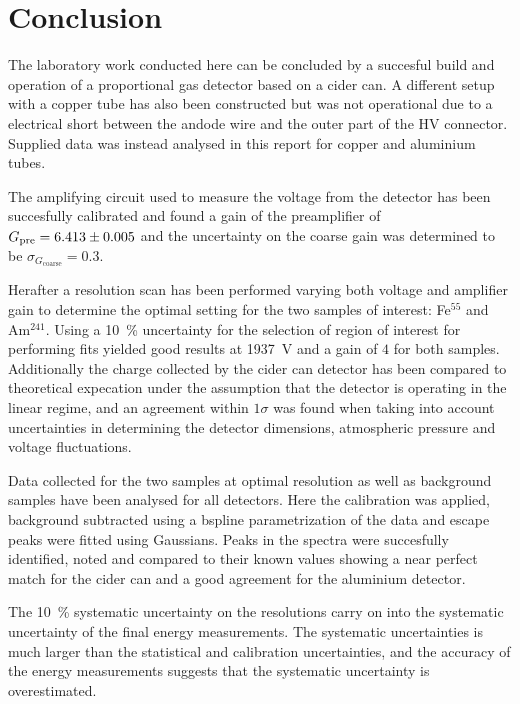 \section{Conclusion}
The laboratory work conducted here can be concluded by a succesful build and
operation of a proportional gas detector based on a cider can. A different setup
with a copper tube has also been constructed but was not operational due to a
electrical short between the andode wire and the outer part of the HV connector.
Supplied data was instead analysed in this report for copper and aluminium
tubes.

The amplifying circuit used to measure the voltage from the detector has been
succesfully calibrated and found a gain of the preamplifier of
$G_\mathrm{pre}=\SI{6.413 \pm 0.005}{}$ and the uncertainty on the coarse gain was
determined to be ${\sigma_{G_\mathrm{coarse}} = 0.3}$.

Herafter a resolution scan has been performed varying both voltage and amplifier
gain to determine the optimal setting for the two samples of interest: Fe$^{55}$
and Am$^{241}$. Using a \SI{10}{\percent} uncertainty for the selection of
region of interest for performing fits yielded good results at \SI{1937}{\volt}
and a gain of $4$ for both samples. Additionally the charge collected by the
cider can detector has been compared to theoretical expecation under the
assumption that the detector is operating in the linear regime, and
an agreement within $1\sigma$ was found when taking into account uncertainties in
determining the detector dimensions, atmospheric pressure and voltage fluctuations.

Data collected for the two samples at optimal resolution as well as background samples have
been analysed for all detectors. Here the calibration was applied, background
subtracted using a bspline parametrization of the data and escape peaks were fitted using
Gaussians. Peaks in the spectra were succesfully identified, noted and compared
to their known values showing a near perfect match for the cider can and a good
agreement for the aluminium detector.

The \SI{10}{\percent} systematic uncertainty on the resolutions carry on into the systematic
uncertainty of the final energy measurements. The systematic uncertainties is much larger than
the statistical and calibration uncertainties, and the accuracy of the energy measurements suggests
that the systematic uncertainty is overestimated.